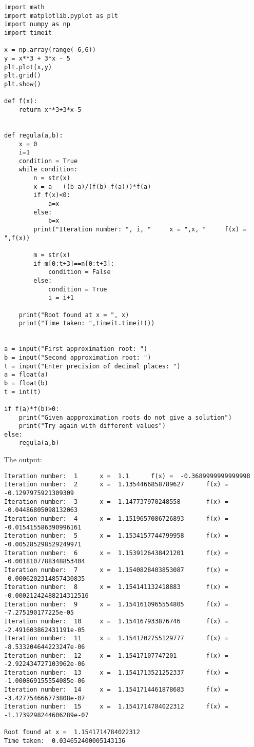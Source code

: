 \documentclass{article}
\begin{document}
\begin{verbatim}
import math
import matplotlib.pyplot as plt
import numpy as np
import timeit

x = np.array(range(-6,6))
y = x**3 + 3*x - 5
plt.plot(x,y)
plt.grid()
plt.show()

def f(x):
    return x**3+3*x-5


def regula(a,b):
    x = 0
    i=1
    condition = True
    while condition:
        n = str(x)
        x = a - ((b-a)/(f(b)-f(a)))*f(a)
        if f(x)<0:
            a=x
        else:
            b=x
        print("Iteration number: ", i, "     x = ",x, "     f(x) = ",f(x))

        m = str(x)
        if m[0:t+3]==n[0:t+3]:
            condition = False
        else:
            condition = True
            i = i+1
    
    print("Root found at x = ", x)
    print("Time taken: ",timeit.timeit())


a = input("First approximation root: ")
b = input("Second approximation root: ")
t = input("Enter precision of decimal places: ")
a = float(a)
b = float(b)
t = int(t)

if f(a)*f(b)>0:
    print("Given appproximation roots do not give a solution")
    print("Try again with different values")
else:
    regula(a,b)
\end{verbatim}

The output:
\begin{verbatim}
Iteration number:  1      x =  1.1      f(x) =  -0.3689999999999998
Iteration number:  2      x =  1.1354466858789627      f(x) =  -0.1297975921309309
Iteration number:  3      x =  1.147737970248558       f(x) =  -0.04486805098132063
Iteration number:  4      x =  1.1519657086726893      f(x) =  -0.015415586390996161
Iteration number:  5      x =  1.1534157744799958      f(x) =  -0.005285298529249971
Iteration number:  6      x =  1.1539126438421201      f(x) =  -0.0018107788348853404
Iteration number:  7      x =  1.1540828403853087      f(x) =  -0.0006202314857430835
Iteration number:  8      x =  1.154141132418883       f(x) =  -0.00021242488214312516
Iteration number:  9      x =  1.1541610965554805      f(x) =  -7.275190177225e-05
Iteration number:  10     x =  1.154167933876746       f(x) =  -2.491603862431191e-05
Iteration number:  11     x =  1.1541702755129777      f(x) =  -8.533204644223247e-06
Iteration number:  12     x =  1.15417107747201        f(x) =  -2.922434727103962e-06
Iteration number:  13     x =  1.1541713521252337      f(x) =  -1.000869155554085e-06
Iteration number:  14     x =  1.1541714461878683      f(x) =  -3.427754666773808e-07
Iteration number:  15     x =  1.1541714784022312      f(x) =  -1.1739298244606289e-07

Root found at x =  1.1541714784022312
Time taken:  0.034652400005143136
\end{verbatim}
\end{document}
